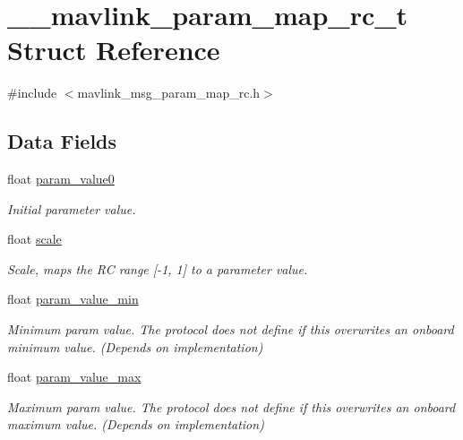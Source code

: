 \hypertarget{struct____mavlink__param__map__rc__t}{\section{\+\_\+\+\_\+mavlink\+\_\+param\+\_\+map\+\_\+rc\+\_\+t Struct Reference}
\label{struct____mavlink__param__map__rc__t}
}


{\ttfamily \#include $<$mavlink\+\_\+msg\+\_\+param\+\_\+map\+\_\+rc.\+h$>$}

\subsection*{Data Fields}
\begin{DoxyCompactItemize}
\item 
float \hyperlink{struct____mavlink__param__map__rc__t_a31fafab661ce9e57eec4108220e584a3}{param\+\_\+value0}
\begin{DoxyCompactList}\small\item\em Initial parameter value. \end{DoxyCompactList}\item 
float \hyperlink{struct____mavlink__param__map__rc__t_acf3ae7ae3426c1a59f1f40e595b68cfc}{scale}
\begin{DoxyCompactList}\small\item\em Scale, maps the R\+C range \mbox{[}-\/1, 1\mbox{]} to a parameter value. \end{DoxyCompactList}\item 
float \hyperlink{struct____mavlink__param__map__rc__t_a2f52d850cde082e38471f77cad638da4}{param\+\_\+value\+\_\+min}
\begin{DoxyCompactList}\small\item\em Minimum param value. The protocol does not define if this overwrites an onboard minimum value. (Depends on implementation) \end{DoxyCompactList}\item 
float \hyperlink{struct____mavlink__param__map__rc__t_a7715dfceec0ff1cd367c221c408ab452}{param\+\_\+value\+\_\+max}
\begin{DoxyCompactList}\small\item\em Maximum param value. The protocol does not define if this overwrites an onboard maximum value. (Depends on implementation) \end{DoxyCompactList}\item 

\end{DoxyCompactItemize}
